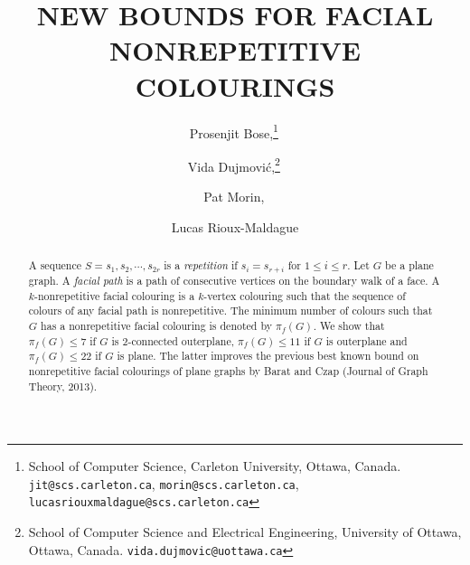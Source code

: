 \documentclass{patmorin}
\title{\MakeUppercase{New Bounds for Facial Nonrepetitive Colourings}}
\date{}
\author{Prosenjit Bose,\thanks{School of Computer Science, Carleton University, Ottawa, Canada. \texttt{jit@scs.carleton.ca}, \texttt{morin@scs.carleton.ca}, \texttt{lucasriouxmaldague@scs.carleton.ca}}\, %
\and Vida Dujmovi{\'c},\thanks{School of Computer Science and Electrical Engineering, University of Ottawa, Ottawa, Canada. \texttt{vida.dujmovic@uottawa.ca}}\,
\and Pat Morin,\samethanks[1]\, \and Lucas Rioux-Maldague\samethanks[1] }
\begin{document}


%
%
%



%
%

\maketitle

\begin{abstract}
A sequence $S=s_1,s_2,\cdots,s_{2r}$ is a \emph{repetition} if
$s_i=s_{r+i}$ for $1 \leq i \leq r$. Let $G$ be a plane graph. A
\emph{facial path} is a path of consecutive vertices on the boundary walk
of a face. A $k$-nonrepetitive facial colouring is a $k$-vertex colouring
such that the sequence of colours of any facial path is nonrepetitive. The
minimum number of colours such that $G$ has a nonrepetitive facial
colouring is denoted by $\pi_f(G)$. We show that $\pi_f(G)\leq 7$ if $G$
is 2-connected outerplane, $\pi_f(G) \leq 11$ if $G$ is outerplane and
$\pi_f(G)\leq 22$ if $G$ is plane. The latter improves the previous best
known bound on nonrepetitive facial colourings of plane graphs by Barat
and Czap (Journal of Graph Theory, 2013).

\end{abstract}
\end{document}
